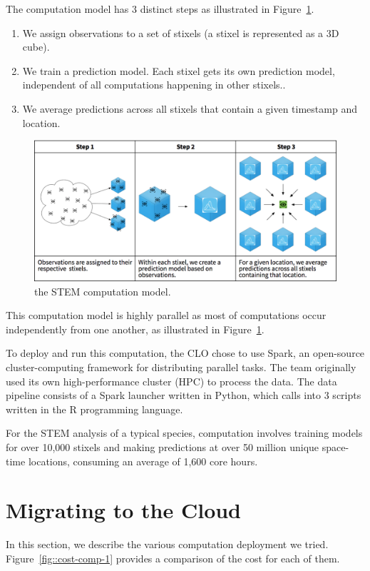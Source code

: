 \documentclass{acm_proc_article-sp}
\begin{document}
The computation model has 3 distinct steps as illustrated in Figure~\ref{fig::computational-model}.

\begin{enumerate}[noitemsep, topsep=-5pt]
\item We assign observations to a set of stixels (a stixel is represented as a 3D cube).
\item We train a prediction model. Each stixel gets its own prediction model, independent of all computations happening in other stixels..  
\item We average predictions across all stixels that contain a given timestamp and location.
\end{enumerate}

\begin{figure}
    \includegraphics[width=\textwidth]{IMG/stem-computational-model.png}
    \caption{the STEM computation model.}
    \label{fig::computational-model}
  \end{figure}


This computation model is highly parallel as most of computations occur independently from one another, as illustrated in Figure~\ref{fig::computational-model}.

To deploy and run this computation, the CLO chose to use Spark, an open-source cluster-computing framework for distributing parallel tasks. The team originally used its own high-performance cluster (HPC) to process the data. The data pipeline consists of a Spark launcher written in Python, which calls into 3 scripts written in the R programming language. 

For the STEM analysis of a typical species,  computation involves training models for over 10,000 stixels and making predictions at over 50 million unique space-time locations, consuming an average of 1,600 core hours.

\section{Migrating to the Cloud}\label{sec::migration}
In this section, we describe the various computation deployment we tried. Figure~\ref{fig::cost-comp-1} provides a comparison of the cost for each of them.
\end{document}
